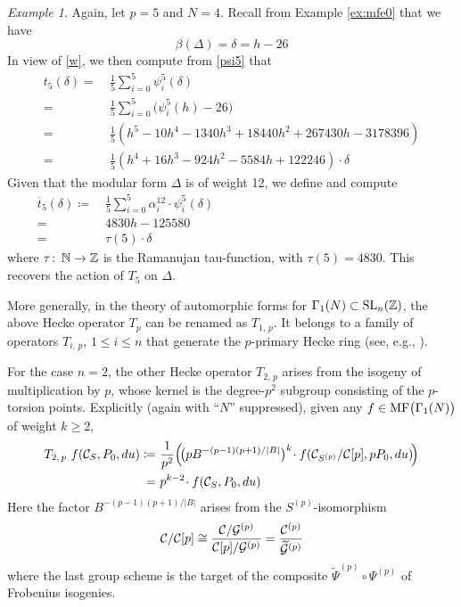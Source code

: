 \documentclass{gtpart}
\theoremstyle{definition}
\theoremstyle{remark}
\newtheorem{ex}[thm]{Example}
\def\co{\colon\thinspace}
\newcommand{\mb}[1]{\mathbb{#1}}
\newcommand{\CC}{{\cal C}}
\newcommand{\CG}{{\cal G}}
\newcommand{\BN}{{\mb N}}
\newcommand{\BZ}{{\mb Z}}
\newcommand{\MF}{{\rm MF}}
\newcommand{\A}{\alpha}
\newcommand{\B}{\beta}
\renewcommand{\D}{\Delta}
\renewcommand{\d}{\delta}
\newcommand{\G}{\Gamma}
\newcommand{\T}{\tau}
\newcommand{\ce}{\coloneqq}
\renewcommand{\=}{\approx}
\renewcommand{\-}{\sim}
\newcommand{\SL}{{\rm SL}}
\numberwithin{equation}{section}
\numberwithin{thm}{section}
\begin{document}
\begin{ex}
 \label{ex:ho}
 Again, let $p = 5$ and $N = 4$.  
 Recall from Example \ref{ex:mfe0} that we have 
 \[
  \B(\D) = \d = h - 26 
 \]
 In view of \eqref{w}, we then compute from \eqref{psi5} that 
 \begin{equation*}
  \begin{split}
   t_5(\d) = & ~ \frac{1}{5} \sum_{i=0}^5 \psi^5_i(\d) \\
           = & ~ \frac{1}{5} \sum_{i=0}^5 \big(\psi^5_i(h) - 26\big) \\
           = & ~ \frac{1}{5} (h^5 - 10 h^4 - 1340 h^3 + 18440 h^2 + 267430 h - 3178396) \\
           = & ~ \frac{1}{5} (h^4 + 16 h^3 - 924 h^2 - 5584 h + 122246) \cdot \d 
  \end{split}
 \end{equation*}
 Given that the modular form $\D$ is of weight 12, we define and compute 
 \begin{equation*}
  \begin{split}
   \overline{t}_5(\d) \ce & ~ \frac{1}{5} \sum_{i=0}^5 \A_i^{12} \cdot \psi^5_i(\d) \qquad\qquad\qquad\qquad\qquad\qquad\qquad\qquad\quad \\
                        = & ~ 4830 h - 125580 \\
                        = & ~ \T(5) \cdot \d 
  \end{split}
 \end{equation*}
 where $\T \co \BN \to \BZ$ is the Ramanujan tau-function, with $\T(5) = 4830$.  
 This recovers the action of $T_5$ on $\D$.  
\end{ex}

More generally, in the theory of automorphic forms for $\G_1(N) \subset \SL_n(\BZ)$, 
the above Hecke operator $T_p$ can be renamed as $T_{1,\,p}$.  
It belongs to a family of operators $T_{i,\,p}$, $1 \leq i \leq n$ 
that generate the $p$-primary Hecke ring (see, e.g., \cite[Theorem 3.20]{AF}).  

For the case $n = 2$, the other Hecke operator $T_{2,\,p}$ arises from the isogeny of multiplication by $p$, whose kernel is the degree-$p^2$ subgroup consisting of the $p$-torsion points.  
Explicitly (again with ``$N$'' suppressed), given any $f \in \MF\big(\G_1(N)\big)$ of weight $k \geq 2$, 
\begin{equation}
 \label{T2p}
 \begin{split}
  T_{2,\,p}~f(\CC_S, P_0, du) \ce & ~ \frac{1}{p^2} \Big(\! \big( p B^{-(p - 1)(p + 1)/|B|} \big)^k \!\cdot f\!\left(\CC_{S^{(p)}}/\CC[p], p P_0, du\right) \!\!\Big) \\
                                = & ~ p^{k - 2} \!\cdot f(\CC_S, P_0, du) 
 \end{split}
\end{equation}
Here the factor $B^{-(p - 1)(p + 1)/|B|}$ arises from the $S^{(p)}$-isomorphism 
\begin{equation}
 \label{iso}
 \CC/\CC[p] \cong \frac{\CC/\CG^{(p)}}{\CC[p]/\CG^{(p)}} = \frac{\CC^{(p)}}{\widetilde{\CG}^{(p)}} 
\end{equation}
where the last group scheme is the target of the composite $\widetilde{\Psi}^{(p)} \circ \Psi^{(p)}$ of Frobenius isogenies.  
\end{document}

